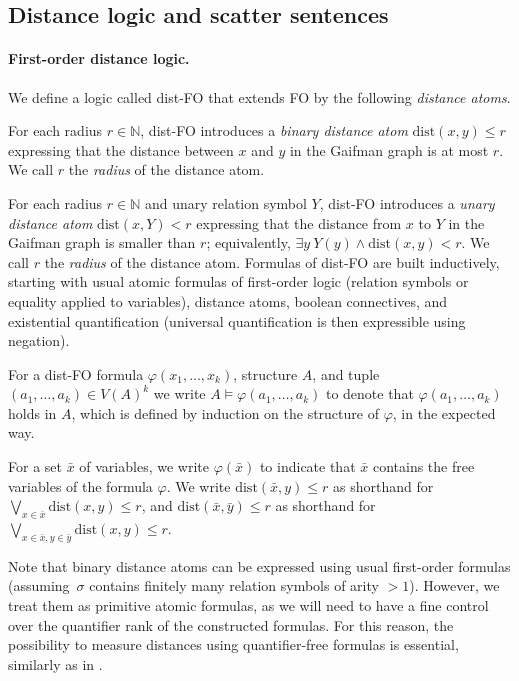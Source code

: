 \documentclass[11pt]{article}
\renewenvironment{quote}
  {\list{}{\leftmargin=0.5cm \rightmargin=0.5cm} %
   \item\relax}
  {\endlist}
\theoremstyle{remark}
\def\phi{\varphi}
\def\N{\mathbb N}
\renewcommand{\subset}{\subseteq}
\renewcommand{\le}{\leqslant}
\newcommand{\dist}{\mathrm{dist}}
\newcommand{\distFO}{\textrm{\upshape dist-FO}\xspace}
\begin{document}
\subsection{Distance logic and scatter sentences}\label{sec:typedefs}


\paragraph{First-order distance logic.}
We define a logic called \distFO that extends FO by the following \emph{distance atoms}.
\begin{quote}
     For each radius \(r \in \N\), \distFO introduces
        a \emph{binary distance atom} \(\dist(x,y) \le r\) expressing that the distance between \(x\) and \(y\) in the Gaifman graph is at most \(r\).
        We call \(r\) the \emph{radius} of the distance atom.

     For each radius \(r \in \N\) and unary relation symbol \(Y\), \distFO introduces
        a \emph{unary distance atom} \(\dist(x,Y) < r\) expressing that the distance from \(x\) to \(Y\) in the Gaifman graph is smaller than \(r\);
        equivalently, \(\exists y~Y(y) \land \dist(x,y) < r\).
        We call \(r\) the \emph{radius} of the distance atom.
\end{quote}
Formulas of \distFO are built inductively,
starting with usual atomic formulas of first-order logic (relation symbols or equality applied to variables), distance atoms, boolean connectives, and existential quantification (universal quantification is then expressible using negation).


For a \distFO formula $\phi(x_1,\ldots,x_k)$, structure $A$, %
and  tuple $(a_1,\ldots,a_k)\in V(A)^k$
we write $A\models\phi(a_1,\ldots,a_k)$
to denote
that $\phi(a_1,\ldots,a_k)$ holds in $A$, which is defined by induction on the structure of $\phi$, in the expected way.

For a set $\bar x$ of variables, 
we write $\phi(\bar x)$ to indicate that $\bar x$ contains the free variables of the formula $\phi$.
We write \(\dist(\bar x,y) \le r\) as shorthand for \(\bigvee_{x \in \bar x}\dist(x,y) \le r\), and
\(\dist(\bar x,\bar y) \le r\) as shorthand for
\(\bigvee_{x\in \bar x, y \in \bar y}\dist(x,y) \le r\).




Note that binary distance atoms can be expressed
using usual first-order formulas (assuming~$\sigma$ contains finitely many relation symbols of arity ${>}1$).
However, we treat them as primitive atomic formulas, as
we will need to have a fine control over the quantifier rank of the constructed formulas. For this reason, the possibility to measure distances using quantifier-free formulas is essential, similarly as in \cite{gks}.
\end{document}
